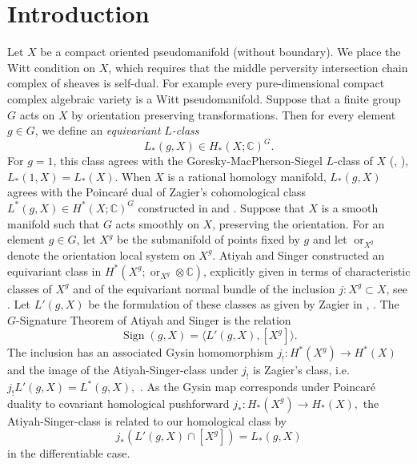 \documentclass{amsart}
\theoremstyle{definition}
\theoremstyle{remark}
\newcommand {\cplx}  {\ensuremath{\mathbb{C}}}
\newcommand {\Sign}    {{\ensuremath{\operatorname{Sign}}}}
\begin{document}
\maketitle



\tableofcontents



\section{Introduction}

Let $X$ be a compact oriented pseudomanifold (without boundary).
We place the Witt condition on $X$, which requires that the middle perversity
intersection chain complex of sheaves is self-dual. For example every
pure-dimensional compact complex algebraic variety is a Witt pseudomanifold.
Suppose that a finite group $G$ acts on $X$ by orientation preserving
transformations. Then for every element $g\in G$, we define an
\emph{equivariant $L$-class}
\[ L_* (g,X) \in H_* (X;\cplx)^G.  \]
For $g=1$, this class agrees with the Goresky-MacPherson-Siegel
$L$-class of $X$ (\cite{gmih1}, \cite{siegel}), $L_* (1,X) = L_* (X)$.
When $X$ is a rational homology manifold, $L_* (g,X)$ agrees with the
Poincar\'e dual of Zagier's cohomological class $L^* (g,X) \in H^* (X;\cplx)^G$
constructed in \cite{zagier} and \cite{zagiertopology}.
Suppose that $X$ is a smooth manifold such that
$G$ acts smoothly on $X$, preserving the orientation.
For an element $g\in G$, let $X^g$ be the submanifold of points fixed by $g$
and let $\operatorname{or}_{X^g}$ denote the orientation local system on $X^g$.
Atiyah and Singer constructed an equivariant class
in $H^* (X^g; \operatorname{or}_{X^g} \otimes \cplx)$,
explicitly given in terms of characteristic
classes of $X^g$ and of the equivariant normal bundle of the inclusion
$j: X^g \subset X$, see \cite[p. 582]{atiyahsinger}. 
Let $L' (g,X)$ be the formulation of these classes
as given by Zagier in \cite[p. 12, (27)]{zagier}, \cite{zagiertopology}.
The $G$-Signature Theorem of Atiyah and Singer is the relation
\[ \Sign (g,X) = \langle L' (g,X), [X^g] \rangle. \] 
The inclusion has an associated Gysin homomorphism
$j_!: H^* (X^g) \to H^* (X)$ and the image of the Atiyah-Singer-class under $j_!$
is Zagier's class, i.e. $j_! L'(g,X) = L^* (g,X),$
\cite[p. 4, (3); p. 21, Thm. 1]{zagier}.
As the Gysin map corresponds under Poincar\'e duality to covariant
homological pushforward $j_*: H_* (X^g) \to H_* (X),$ the Atiyah-Singer-class
is related to our homological class by
\[ j_* (L'(g,X) \cap [X^g]) = L_* (g,X)  \]
in the differentiable case.
\end{document}

